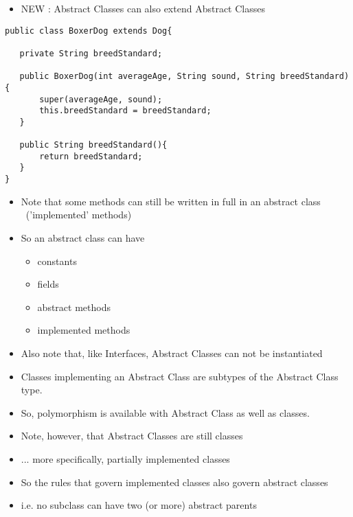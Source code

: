 \documentclass{beamer}
\begin{document}
\begin{frame}[fragile]
\begin{itemize}
\item NEW : Abstract Classes can also extend Abstract Classes
\end{itemize}
\begin{block}{}
\begin{lstlisting}
public class BoxerDog extends Dog{
   
   private String breedStandard; 
   
   public BoxerDog(int averageAge, String sound, String breedStandard){
       super(averageAge, sound);
       this.breedStandard = breedStandard;
   }
   
   public String breedStandard(){
       return breedStandard;
   }
}
\end{lstlisting}
\end{block}
\end{frame}

\begin{frame}
\begin{itemize}
\item Note that some methods can still be written in full in an abstract class \ ('implemented{}' methods)
\bigskip
\item So an abstract class can have 
\begin{itemize}
\item constants
\item fields
\item abstract methods
\item implemented methods
\end{itemize}
\end{itemize}
\end{frame}

\begin{frame}
\begin{itemize}
\item Also note that, like Interfaces, Abstract Classes can not be instantiated
\item Classes implementing an Abstract Class are subtypes of the Abstract Class type.
\item So, polymorphism is available with Abstract Class as well as classes.
\end{itemize}
\end{frame}

\begin{frame}
\begin{itemize}
\item Note, however, that Abstract Classes are still classes
\item ... more specifically, partially implemented classes
\bigskip
\item So the rules that govern implemented classes also govern abstract classes 
\item i.e. no subclass can have two (or more) abstract parents
\end{itemize}
\end{frame}
\end{document}
